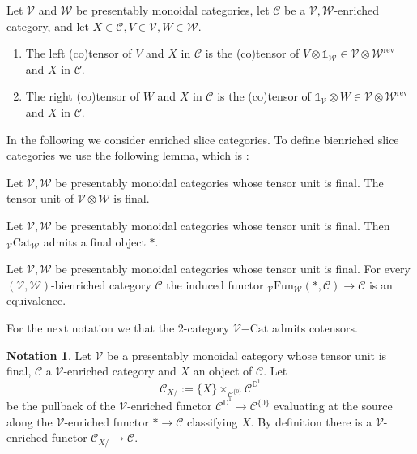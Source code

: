 \documentclass[10pt,oneside]{article}
\numberwithin{equation}{section} %
\numberwithin{figure}{section} %
\theoremstyle{plain}
\theoremstyle{definition}
\newtheorem{notation}[thm]{Notation}
\newcommand{\bD}{{\mathbb D}}
\newcommand{\mC}{{\mathcal C}}
\newcommand{\mV}{{\mathcal V}}
\newcommand{\mW}{{\mathcal W}}
\newcommand{\X}{X}
\newcommand{\rev}{{\mathrm{rev}}}
\newcommand{\ot}{\otimes}
\newcommand{\Cat}{\mathrm{Cat}}
\newcommand{\Fun}{\mathrm{Fun}}
\newcommand{\tu}{{\mathbb 1}}
\begin{document}
\begin{definition}Let $\mV$ and $\mW$ be presentably monoidal categories, let $\mC$ be a  
$\mV,\mW$-enriched category, and let $X \in \mC, V \in \mV, W \in \mW.$	 
\begin{enumerate}[\normalfont(1)]\setlength{\itemsep}{-2pt}
\item The left (co)tensor of $V$ and $X$ in $\mC$ is the (co)tensor of
$V \ot \tu_\mW \in \mV \ot \mW^\rev$ and $X$ in $\mC.$

\item The right (co)tensor of $W$ and $X$ in $\mC$ is the (co)tensor of
$\tu_\mV \ot W \in \mV \ot \mW^\rev$ and $X$ in $\mC.$


\end{enumerate}

\end{definition}

In the following we consider enriched slice categories.
To define bienriched slice categories we use the following lemma, which is \cite[Lemma 2.1.23.]{oriented}: 

\begin{lemma}\label{tensorunit}
Let $\mV, \mW$ be presentably monoidal categories whose tensor unit is final.
The tensor unit of $\mV \ot \mW$ is final.
	
\end{lemma}



\begin{corollary}\label{finality}
	
Let $\mV, \mW$ be presentably monoidal categories whose tensor unit is final.
Then ${_\mV \Cat_\mW}$ admits a final object $*$.
	
\end{corollary}

\begin{corollary}Let $\mV, \mW$ be presentably monoidal categories whose tensor unit is final.
For every $(\mV,\mW)$-bienriched category $\mC$
the induced functor ${_\mV\Fun_\mW}(*,\mC) \to \mC$ is an equivalence.
    
\end{corollary}


For the next notation we that the 2-category $\mV\mathrm{-}\Cat$ admits cotensors.

\begin{notation}
Let $\mV$ be a presentably monoidal category whose tensor unit is final, $\mC$ a $\mV$-enriched category and $X $ an object of $\mC.$
Let $$ \mC_{\X/}:= \{X\} \times_{\mC^{\{0\}}} \mC^{\bD^1} $$ be the pullback of the $\mV$-enriched functor $\mC^{\bD^1} \to \mC^{\{0\}}$ evaluating at the source along the $\mV$-enriched functor $* \to \mC$ classifying $X$. 
By definition there is a $\mV$-enriched functor $\mC_{\X/}\to \mC$.
    
\end{notation}
\end{document}
